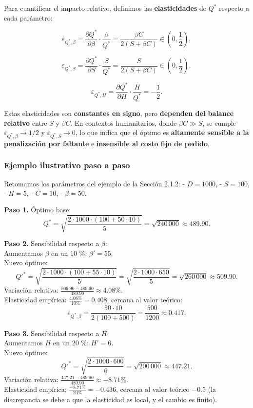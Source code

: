 \documentclass[
  spanish,
  us-letterpaper,
  DIV=11,
  numbers=noendperiod]{scrreprt}
\numberwithin{equation}{section}
\begin{document}
Para cuantificar el impacto relativo, definimos las
\textbf{elasticidades} de \(Q^*\) respecto a cada parámetro:

\[
\varepsilon_{Q^*, \beta} = \frac{\partial Q^*}{\partial \beta} \cdot \frac{\beta}{Q^*} = \frac{\beta C}{2(S + \beta C)} \in \left(0, \frac{1}{2}\right),
\]

\[
\varepsilon_{Q^*, S} = \frac{\partial Q^*}{\partial S} \cdot \frac{S}{Q^*} = \frac{S}{2(S + \beta C)} \in \left(0, \frac{1}{2}\right),
\]

\[
\varepsilon_{Q^*, H} = \frac{\partial Q^*}{\partial H} \cdot \frac{H}{Q^*} = -\frac{1}{2}.
\]

Estas elasticidades son \textbf{constantes en signo}, pero
\textbf{dependen del balance relativo} entre \(S\) y \(\beta C\). En
contextos humanitarios, donde \(\beta C \gg S\), se cumple
\(\varepsilon_{Q^*, \beta} \to 1/2\) y \(\varepsilon_{Q^*, S} \to 0\),
lo que indica que el óptimo es \textbf{altamente sensible a la
penalización por faltante} e \textbf{insensible al costo fijo de
pedido}.

\subsubsection{Ejemplo ilustrativo paso a
paso}\label{ejemplo-ilustrativo-paso-a-paso}

Retomamos los parámetros del ejemplo de la Sección 2.1.2: -
\(D = 1000\), - \(S = 100\), - \(H = 5\), - \(C = 10\), -
\(\beta = 50\).

\textbf{Paso 1.} Óptimo base: \[
Q^* = \sqrt{\frac{2 \cdot 1000 \cdot (100 + 50 \cdot 10)}{5}} = \sqrt{240\,000} \approx 489.90.
\]

\textbf{Paso 2.} Sensibilidad respecto a \(\beta\):\\
Aumentamos \(\beta\) en un 10 \%: \(\beta' = 55\).\\
Nuevo óptimo: \[
Q'^* = \sqrt{\frac{2 \cdot 1000 \cdot (100 + 55 \cdot 10)}{5}} = \sqrt{\frac{2 \cdot 1000 \cdot 650}{5}} = \sqrt{260\,000} \approx 509.90.
\] Variación relativa:
\(\frac{509.90 - 489.90}{489.90} \approx 4.08\%\).\\
Elasticidad empírica: \(\frac{4.08\%}{10\%} = 0.408\), cercana al valor
teórico: \[
\varepsilon_{Q^*, \beta} = \frac{50 \cdot 10}{2(100 + 500)} = \frac{500}{1200} \approx 0.417.
\]

\textbf{Paso 3.} Sensibilidad respecto a \(H\):\\
Aumentamos \(H\) en un 20 \%: \(H' = 6\).\\
Nuevo óptimo: \[
Q'^* = \sqrt{\frac{2 \cdot 1000 \cdot 600}{6}} = \sqrt{200\,000} \approx 447.21.
\] Variación relativa:
\(\frac{447.21 - 489.90}{489.90} \approx -8.71\%\).\\
Elasticidad empírica: \(\frac{-8.71\%}{20\%} = -0.436\), cercana al
valor teórico \(-0.5\) (la discrepancia se debe a que la elasticidad es
local, y el cambio es finito).
\end{document}
